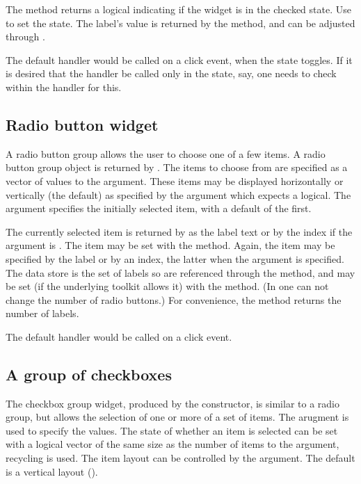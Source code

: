 The  method returns a logical indicating if
the widget is in the checked state. Use  to set
the state. The label's value is returned by the
\method{[}{gcheckbox} method, and can be adjusted through 
\method{[\ASSIGN}{gcheckbox}.

The default handler would be called on a click event, when the state toggles. If it is desired
that the handler be called only in the  state, say, one
needs to check within the handler for this.

\subsection{Radio button widget}
\label{sec:gWidgets-radio-button-widget}

A radio button group allows the user to choose one of a few
items. A radio button group object is returned by
. The items to choose from are specified as a
vector of values to the  argument. These items
may be displayed horizontally or vertically (the default) as specified by the
 argument which expects a logical. The
 argument specifies the initially selected item,
with a default of the first.

The currently selected item is returned by  as
the label text or by the index if the argument  is
. The item may be set with the
 method. Again, the item may be
specified by the label or by an index, the latter when the argument
 is specified. The data store is the set of labels so
are referenced through the \method{[}{gradio} method, and may be set
(if the underlying toolkit allows it) with the
\method{[\ASSIGN}{gradio} method. (In  one can not
change the number of radio buttons.) For convenience, the
 method returns the number of labels.

The default handler would be called on a click event.

\subsection{A group of checkboxes}
\label{sec:gWidgets-group-checkboxes}


The checkbox group widget, produced by the
 constructor, is similar to a radio group,
but allows the selection of one or more of a set of items.  The
 arugment is used to specify the
values. The state of whether an item is selected can be set with a
logical vector of the same size as the number of items to the
 argument, recycling is used. The
item layout can be controlled by the
 argument. The default is a
vertical layout ().

